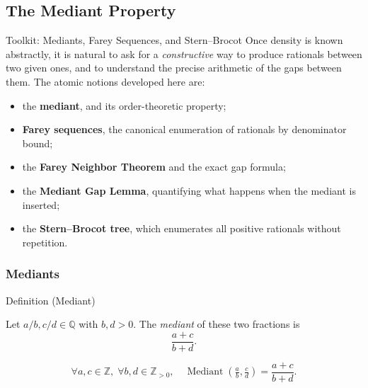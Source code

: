 
\subsection*{The Mediant Property}
\label{sec:mediant}

\begin{toolkitbox}{Toolkit: Mediants, Farey Sequences, and Stern--Brocot}
Once density is known abstractly, it is natural to ask for a \emph{constructive}
way to produce rationals between two given ones, and to understand the precise
arithmetic of the gaps between them.  The atomic notions developed here are:
\begin{itemize}
  \item the \textbf{mediant}, and its order-theoretic property;
  \item \textbf{Farey sequences}, the canonical enumeration of rationals by
        denominator bound;
  \item the \textbf{Farey Neighbor Theorem} and the exact gap formula;
  \item the \textbf{Mediant Gap Lemma}, quantifying what happens when the
        mediant is inserted;
  \item the \textbf{Stern--Brocot tree}, which enumerates all positive rationals
        without repetition.
\end{itemize}
\end{toolkitbox}

\subsubsection*{Mediants}

\begin{definitionbox}{Definition (Mediant)}
\begin{definition}[Mediant]
\label{def:mediant}
Let $a/b, c/d \in \mathbb{Q}$ with $b, d > 0$.
The \emph{mediant} of these two fractions is
\[
\frac{a+c}{b+d}.
\]
\end{definition}
\end{definitionbox}

\begin{remark*}
\[
\forall a,c \in \mathbb{Z},\; \forall b,d \in \mathbb{Z}_{>0},\quad
\operatorname{Mediant}\!\left(\tfrac{a}{b},\tfrac{c}{d}\right)
= \frac{a+c}{b+d}.
\]
\end{remark*}

